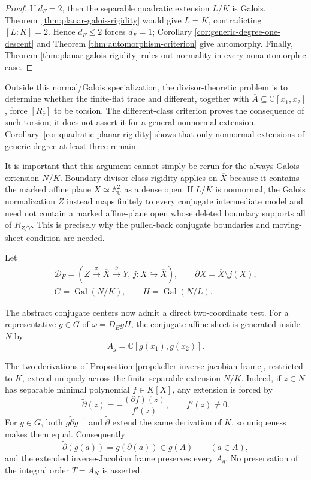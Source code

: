 \documentclass[11pt]{article}
\theoremstyle{remark}
\theoremstyle{definition}
\DeclareMathOperator{\Gal}{Gal}
\newcommand{\A}{\mathbb A}
\newcommand{\C}{\mathbb C}
\begin{document}
\begin{proof}
If \(d_F=2\), then the separable quadratic extension \(L/K\) is Galois.
Theorem~\ref{thm:planar-galois-rigidity} would give \(L=K\), contradicting
\([L:K]=2\).  Hence \(d_F\leq2\) forces \(d_F=1\); Corollary
\ref{cor:generic-degree-one-descent} and Theorem
\ref{thm:automorphism-criterion} give automorphy.  Finally, Theorem
\ref{thm:planar-galois-rigidity} rules out normality in every
nonautomorphic case.
\end{proof}

Outside this normal/Galois specialization, the divisor-theoretic problem is
to determine whether the finite-flat trace and different, together with
\(\overline A\subseteq\C[x_1,x_2]\), force
\([R_{\bar\nu}]\) to be torsion.  The different-class criterion proves the
consequence of such torsion; it does not assert it for a general nonnormal
extension.  Corollary~\ref{cor:quadratic-planar-rigidity} shows that only
nonnormal extensions of generic degree at least three remain.

It is important that this argument cannot simply be rerun for the always
Galois extension \(N/K\).  Boundary divisor-class rigidity applies on
\(\overline X\) because it contains the marked affine plane
\(X\simeq\A^2_{\C}\) as a dense open.  If \(L/K\) is nonnormal, the Galois
normalization \(Z\) instead maps finitely to every conjugate intermediate
model and need not contain a marked affine-plane open whose deleted boundary
supports all of \(R_{Z/Y}\).  This is precisely why the pulled-back
conjugate boundaries and moving-sheet condition are needed.

Let
\[
  \begin{gathered}
    \mathcal D_F=
    \left(
      Z\xrightarrow{\pi}\overline X\xrightarrow{\bar\nu}Y,\,
      j\colon X\hookrightarrow\overline X
    \right),
    \qquad
    \partial X=\overline X\setminus j(X),\\
    G=\Gal(N/K),
    \qquad
    H=\Gal(N/L).
  \end{gathered}
\]

The abstract conjugate centers now admit a direct two-coordinate test.
For a representative \(g\in G\) of
\(\omega=D_EgH\), the conjugate affine sheet is generated inside \(N\) by
\[
  A_g=\C[g(x_1),g(x_2)].
\]

The two derivations of Proposition
\ref{prop:keller-inverse-jacobian-frame}, restricted to \(K\), extend
uniquely across the finite separable extension \(N/K\).  Indeed, if
\(z\in N\) has separable minimal polynomial \(f\in K[X]\), any extension
is forced by
\[
  \widetilde\partial(z)
  =-\frac{(\partial f)(z)}{f'(z)},
  \qquad f'(z)\ne0.
\]
For \(g\in G\), both
\(g\widetilde\partial g^{-1}\) and \(\widetilde\partial\) extend the same
derivation of \(K\), so uniqueness makes them equal.  Consequently
\[
  \widetilde\partial(g(a))=g(\partial(a))\in g(A)
  \qquad(a\in A),
\]
and the extended inverse-Jacobian frame preserves every \(A_g\).  No
preservation of the integral order \(T=A_N\) is asserted.
\end{document}
